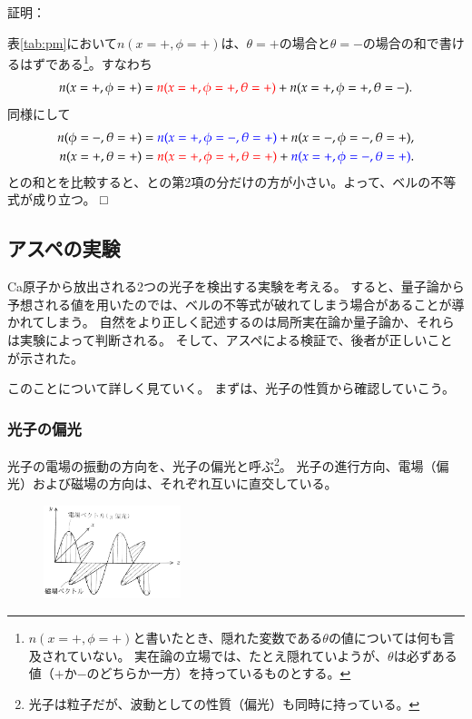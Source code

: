 \documentclass[10pt,b5paper,papersize,dvipdfmx]{jsbook}
\renewcommand\qed{\hfill □\par} %
\newcommand\hyo[1]{表\ref{tab:#1}}
\begin{document}
\noindent 証明：\par
\hyo{pm}において$n(x=+,\phi=+)$は、$\theta = +$の場合と$\theta = -$の場合の和で書けるはずである\footnote{
  $n(x=+,\phi=+)$と書いたとき、隠れた変数である$\theta$の値については何も言及されていない。
  実在論の立場では、たとえ隠れていようが、$\theta$は必ずある値（$+$か$-$のどちらか一方）を持っているものとする。
}。すなわち
\begin{align}
  \label{eq:bell-1}
  n(x=+,\phi=+) = \textcolor{red}{n(x=+,\phi=+, \theta=+)} + n(x=+,\phi=+, \theta=-).
\end{align}
同様にして
\begin{align}
  \label{eq:bell-2}
  n(\phi=-,\theta=+) &= \textcolor{blue}{n(x=+, \phi=-,\theta=+)} + n(x=-, \phi=-,\theta=+)
  , \\
  \label{eq:bell-3}
  n(x=+,\theta=+) &= \textcolor{red}{n(x=+, \phi=+, \theta=+)} + \textcolor{blue}{n(x=+, \phi=-, \theta=+)}.
\end{align}
との和とを比較すると、との第2項の分だけの方が小さい。よって、ベルの不等式が成り立つ。
\qed

%
\subsection{アスペの実験} %
Ca原子から放出される2つの光子を検出する実験を考える。
すると、量子論から予想される値を用いたのでは、ベルの不等式が破れてしまう場合があることが導かれてしまう。
自然をより正しく記述するのは局所実在論か量子論か、それらは実験によって判断される。
そして、アスペによる検証で、後者が正しいことが示された。\par
このことについて詳しく見ていく。
まずは、光子の性質から確認していこう。

%
\subsubsection{光子の偏光} %

光子の電場の振動の方向を、光子の偏光と呼ぶ\footnote{
  光子は粒子だが、波動としての性質（偏光）も同時に持っている。
}。
光子の進行方向、電場（偏光）および磁場の方向は、それぞれ互いに直交している。

\begin{figure}[ht]
  \centering
  \includegraphics[width=40mm]{nkym/fig/henkou.jpeg}
\end{figure}
\end{document}
